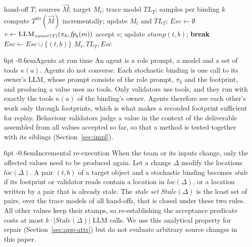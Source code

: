 \documentclass[pdflatex,sn-mathphys-num]{sn-jnl}
\makeatletter
\theoremstyle{thmstyleone}%
\theoremstyle{thmstyletwo}%
\theoremstyle{thmstylethree}%
\newcommand{\tool}{\textsc{AgentHOT}}
\newcommand{\TL}{\mathit{TL}}
\newcommand{\fp}{\mathit{fp}}
\newcommand{\Stale}{\mathit{Stale}}
\newcommand{\chk}{\mathit{chk}}
\renewcommand\paragraph{\@startsection{paragraph}{4}{\z@}%
  {6pt \@plus 2pt \@minus 1pt}{-0.6em}{\normalfont\normalsize\bfseries}}
\makeatother
\begin{document}
\begin{algorithm}[t]
\caption{\tool{}: executing one hybrid hand-off $T$ (runtime)}\label{alg:handoff}
\begin{algorithmic}[1]
\Require hand-off $T$; sources $\vec{M}$; target $M_t$; trace model $\TL_T$; samples per binding $k$
\State compute $T^{\mathrm{str}}(\vec M)$ incrementally; update $M_t$ and $\TL_T$; $\mathit{Esc}\gets\emptyset$ 
    \State $v\gets\textsc{LLM}_{\mathit{owner}(T)}(\pi_b,\fp_b(m))$ 
    \If{$\chk_b(v,\mathit{vr}_b(m))$} accept $v$; update $\mathit{stamp}(t,b)$; \textbf{break} \EndIf
  \EndFor
   $\mathit{Esc}\gets\mathit{Esc}\cup\{(t,b)\}$  \EndIf
\EndFor
\State \Return $M_t,\TL_T,\mathit{Esc}$
\end{algorithmic}
\end{algorithm}

\paragraph{Agents at run time} An agent is a role prompt, a model and a set of
tools $\kappa(a)$. Agents do not converse. Each stochastic binding is one call
to its owner's LLM, whose prompt consists of the role prompt, $\pi_b$ and the
footprint, and producing a value uses no tools. Only validators use tools, and
they run with exactly the tools $\kappa(a)$ of the binding's owner. Agents
therefore see each other's work only through footprints, which is what makes a
recorded footprint sufficient for replay. Behaviour validators judge a value in
the context of the deliverable assembled from all values accepted so far, so
that a method is tested together with its siblings (Section~\ref{sec:impl}).

\paragraph{Incremental re-execution} When the team or its inputs change, only
the affected values need to be produced again. Let a change $\Delta$ modify the
locations $\mathit{loc}(\Delta)$. A pair $(t,b)$ of a target object and a
stochastic binding becomes \emph{stale} if its footprint or validator reads
contain a location in $\mathit{loc}(\Delta)$, or a location written by a pair
that is already stale. The \emph{stale set} $\Stale(\Delta)$ is the least set of
pairs, over the trace models of all hand-offs, that is closed under these two
rules. All other values keep their stamps, so re-establishing the acceptance
predicate costs at most $k\cdot|\Stale(\Delta)|$ LLM calls. We use this
analytical property for repair (Section~\ref{sec:app-attr}) but do not evaluate
arbitrary source changes in this paper.
\end{document}
